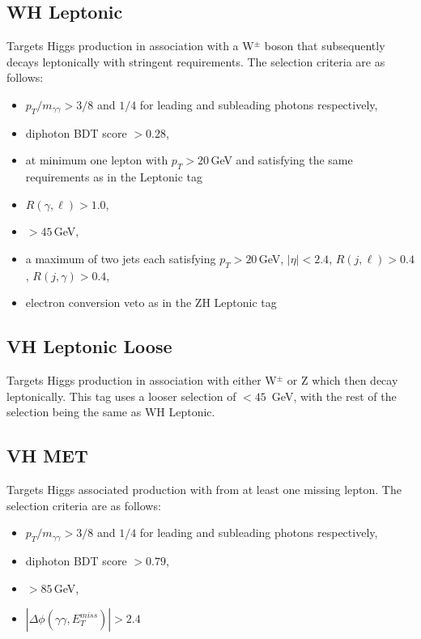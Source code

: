 \subsection{WH Leptonic}
Targets Higgs production in association with a W$^{\pm}$ boson that subsequently decays leptonically with stringent requirements. The selection criteria are as follows:
\begin{itemize}[leftmargin=.5in,noitemsep]
    \item $p_{T}/m_{\gamma\gamma} > 3/8$ and $1/4$ for leading and subleading photons respectively,
    \item diphoton BDT score $> 0.28$,
    \item at minimum one lepton with $p_T > 20$\,GeV and satisfying the same requirements as in the \ttH Leptonic tag
    \item $R(\gamma,\ell) > 1.0$,
    \item \MET$> 45$\,GeV,
    \item a maximum of two jets each satisfying $p_T > 20$\,GeV, $|\eta| < 2.4$, $R(j,\ell) > 0.4$, $R(j,\gamma) > 0.4$,
    \item electron conversion veto as in the ZH Leptonic tag
\end{itemize}



\subsection{VH Leptonic Loose}
Targets Higgs production in association with either W$^{\pm}$ or Z which then decay leptonically. This tag uses a looser \MET selection of \MET$ < 45$\, GeV, with the rest of the selection being the same as WH Leptonic.

\subsection{VH MET}
Targets Higgs associated production with \MET from at least one missing lepton. The selection criteria are as follows:
\begin{itemize}[leftmargin=.5in,noitemsep]
    \item $p_{T}/m_{\gamma\gamma} > 3/8$ and $1/4$ for leading and subleading photons respectively,
    \item diphoton BDT score $> 0.79$,
    \item \MET$> 85$\,GeV,
    \item $|\Delta\phi(\gamma\gamma,E_{T}^{miss})| > 2.4$
\end{itemize}


